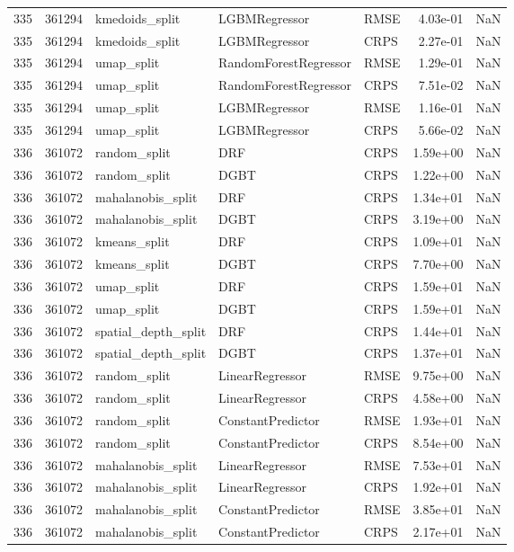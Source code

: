 \begin{tabular}{rrlllrr}
335 & 361294 & kmedoids\_split & LGBMRegressor & RMSE & 4.03e-01 & NaN \\
335 & 361294 & kmedoids\_split & LGBMRegressor & CRPS & 2.27e-01 & NaN \\
335 & 361294 & umap\_split & RandomForestRegressor & RMSE & 1.29e-01 & NaN \\
335 & 361294 & umap\_split & RandomForestRegressor & CRPS & 7.51e-02 & NaN \\
335 & 361294 & umap\_split & LGBMRegressor & RMSE & 1.16e-01 & NaN \\
335 & 361294 & umap\_split & LGBMRegressor & CRPS & 5.66e-02 & NaN \\
336 & 361072 & random\_split & DRF & CRPS & 1.59e+00 & NaN \\
336 & 361072 & random\_split & DGBT & CRPS & 1.22e+00 & NaN \\
336 & 361072 & mahalanobis\_split & DRF & CRPS & 1.34e+01 & NaN \\
336 & 361072 & mahalanobis\_split & DGBT & CRPS & 3.19e+00 & NaN \\
336 & 361072 & kmeans\_split & DRF & CRPS & 1.09e+01 & NaN \\
336 & 361072 & kmeans\_split & DGBT & CRPS & 7.70e+00 & NaN \\
336 & 361072 & umap\_split & DRF & CRPS & 1.59e+01 & NaN \\
336 & 361072 & umap\_split & DGBT & CRPS & 1.59e+01 & NaN \\
336 & 361072 & spatial\_depth\_split & DRF & CRPS & 1.44e+01 & NaN \\
336 & 361072 & spatial\_depth\_split & DGBT & CRPS & 1.37e+01 & NaN \\
336 & 361072 & random\_split & LinearRegressor & RMSE & 9.75e+00 & NaN \\
336 & 361072 & random\_split & LinearRegressor & CRPS & 4.58e+00 & NaN \\
336 & 361072 & random\_split & ConstantPredictor & RMSE & 1.93e+01 & NaN \\
336 & 361072 & random\_split & ConstantPredictor & CRPS & 8.54e+00 & NaN \\
336 & 361072 & mahalanobis\_split & LinearRegressor & RMSE & 7.53e+01 & NaN \\
336 & 361072 & mahalanobis\_split & LinearRegressor & CRPS & 1.92e+01 & NaN \\
336 & 361072 & mahalanobis\_split & ConstantPredictor & RMSE & 3.85e+01 & NaN \\
336 & 361072 & mahalanobis\_split & ConstantPredictor & CRPS & 2.17e+01 & NaN \\

\end{tabular}
